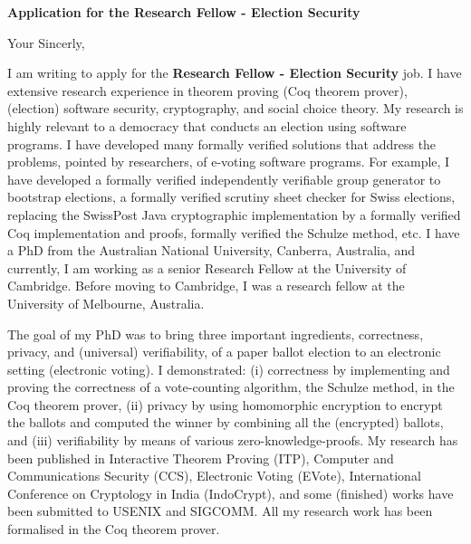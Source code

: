 \documentclass[11pt,a4paper,roman]{moderncv}
\begin{document}
\date{}
\opening{\textbf{Application for the Research Fellow - Election Security}}
\closing{Your Sincerly, \vspace{-1em}}



\makelettertitle


I am writing to apply
for the \textbf{Research Fellow - Election Security} job. 
I have extensive research experience in
theorem proving (Coq theorem prover), (election) software security, cryptography,  
and social choice theory. My research is highly relevant to a democracy that conducts 
an election using software programs. I have developed many formally verified 
solutions that address the problems, pointed by researchers, 
of e-voting software programs. 
For example, I have developed a formally verified independently 
verifiable group generator to bootstrap elections, a formally verified 
scrutiny sheet checker for Swiss elections, replacing the SwissPost Java 
cryptographic implementation by a formally verified Coq implementation and proofs,  
formally verified the Schulze method, etc.
I have a PhD from the Australian National University, Canberra, Australia,
and currently, I am working as a senior Research Fellow at the University of 
Cambridge. Before moving to Cambridge, I was a 
research fellow at the University of Melbourne, Australia.


\vspace{0.5cm}
The goal of my PhD was to 
bring  three important ingredients, correctness, privacy, and (universal) verifiability, of a 
paper ballot election to an electronic setting (electronic voting). I 
demonstrated: (i) correctness by implementing and proving the correctness of 
a vote-counting algorithm, the Schulze method, in the Coq theorem prover, 
(ii) privacy by using homomorphic encryption to encrypt the ballots and computed
the winner by combining all the (encrypted) ballots, and 
(iii) verifiability by means of various zero-knowledge-proofs.
My research has been published in Interactive Theorem Proving (ITP), 
Computer and Communications Security (CCS), Electronic Voting (EVote), 
International Conference on Cryptology in India (IndoCrypt),
and some (finished) works have been submitted to USENIX and SIGCOMM. 
All my research work has been formalised in the Coq theorem prover. 
\end{document}

